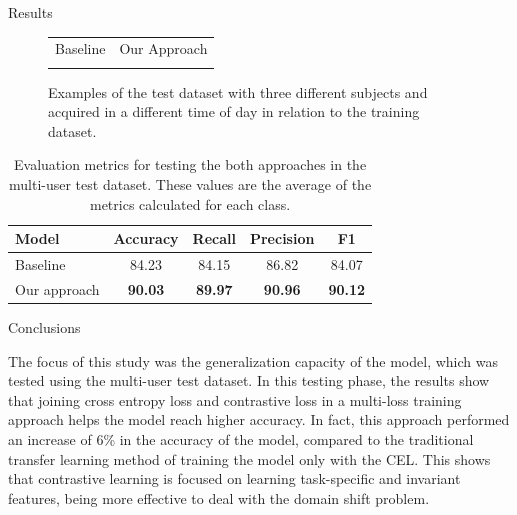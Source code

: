 \documentclass[final]{beamer}
\newlength{\colwidth}
\begin{document}
\begin{frame}[t]
\begin{columns}[t]
\begin{column}{\colwidth}
\begin{block}{Results}
    \begin{figure}[!ht]
      \justify
      \centering
      \def\vsTW{0.2\textwidth}  %
      \setlength{\tabcolsep}{2pt} %
      \newcommand{\vsTE}[1]{\texttt{[image: gestures/\#1.png]}}
      \begin{tabular}{cc}
      \hspace{25mm} Baseline & \hspace{17mm} Our Approach \\
       &  \\
      \end{tabular}
      \caption{Examples of the test dataset with three different subjects and acquired in a different time of day in relation to the training dataset.\label{fig:gestures_test}}
    \end{figure}

    \begin{table}[!ht] 
      \centering
      \begin{tabular}{lcccc}
        \toprule
        \textbf{Model}	& \textbf{Accuracy}	& \textbf{Recall} & \textbf{Precision} & \textbf{F1}\\
        \midrule
        Baseline & 84.23	& 84.15 & 86.82 & 84.07\\
        Our approach & \textbf{90.03} & \textbf{89.97} & \textbf{90.96} & \textbf{90.12} \\
        \bottomrule
      \end{tabular}
      \caption{Evaluation metrics for testing the both approaches in the multi-user test dataset. These values are the average of the metrics calculated for each class.\label{tab:metrics}}
      \end{table}

  \end{block}

  \begin{block}{Conclusions}

    The focus of this study was the generalization capacity of the model, which was tested using the multi-user
    test dataset. In this testing phase, the results show that joining cross entropy loss and contrastive loss in a
    multi-loss training approach helps the model reach higher accuracy. In fact, this approach
    performed an increase of 6\% in the accuracy of the model, compared to the traditional transfer learning
    method of training the model only with the CEL. This shows that contrastive learning is
    focused on learning task-specific and invariant features, being more effective to deal with the domain shift
    problem.


\end{block}
\end{column}
\end{columns}
\end{frame}
\end{document}
